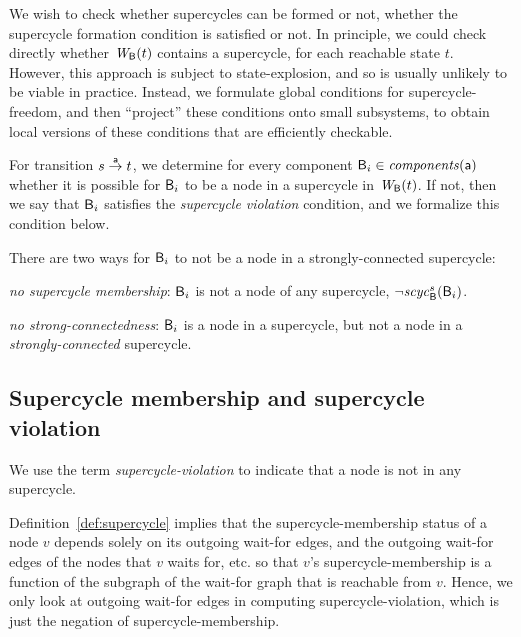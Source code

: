We wish to check whether supercycles can be formed or not, \ie whether the supercycle formation
condition is satisfied or not. In principle, we could check directly
whether $\wfg{\B}{t}$ contains a supercycle, for each reachable state
$t$. However, this approach is subject to state-explosion, and so is usually unlikely to be viable in practice.
Instead, we formulate global conditions for supercycle-freedom, and then ``project'' these
conditions onto small subsystems, to obtain local versions of these conditions that are efficiently checkable.

For transition $s \goesto[\act] t$, we determine for every component $\B_i \in \cmps{\act}$ whether
it is possible for $\B_i$ to be a node in a supercycle in $\wfg{\B}{t}$. 
 If not, then we say that $\B_i$ satisfies the \emph{supercycle
  violation} condition, and we formalize this condition below.

There are two ways for $\B_i$ to not be a node in a strongly-connected supercycle:
\bn
\item \textit{no supercycle membership}: $\B_i$ is not a node of any supercycle, \ie $\neg \scyc{\B}{s}{\B_i}$.

\item \textit{no strong-connectedness}: $\B_i$ is a node in a supercycle, but not a node in a \emph{strongly-connected} supercycle. 

\en





\subsection{Supercycle membership and supercycle violation}

We use the term \emph{supercycle-violation} to indicate that a node is not in any supercycle. 

Definition~\ref{def:supercycle} implies that the supercycle-membership status of a node $v$ depends
solely on its outgoing wait-for edges, and the outgoing wait-for edges of the nodes that $v$ waits
for, etc. so that $v$'s supercycle-membership is a function of the subgraph of the wait-for graph
that is reachable from $v$.  Hence, we only look at outgoing wait-for edges in computing
supercycle-violation, which is just the negation of supercycle-membership.

